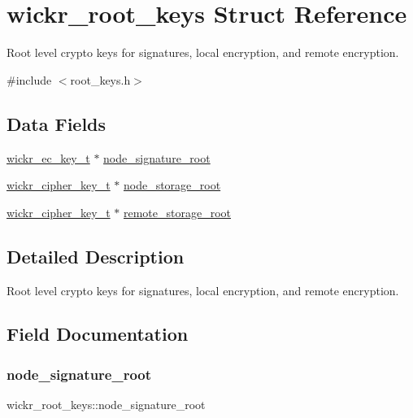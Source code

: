 \hypertarget{structwickr__root__keys}{}\section{wickr\+\_\+root\+\_\+keys Struct Reference}
\label{structwickr__root__keys}


Root level crypto keys for signatures, local encryption, and remote encryption.  




{\ttfamily \#include $<$root\+\_\+keys.\+h$>$}

\subsection*{Data Fields}
\begin{DoxyCompactItemize}
\item 
\mbox{\hyperlink{structwickr__ec__key}{wickr\+\_\+ec\+\_\+key\+\_\+t}} $\ast$ \mbox{\hyperlink{structwickr__root__keys_af3a0ca7b48b356e118dea24c26cdd9f5}{node\+\_\+signature\+\_\+root}}
\item 
\mbox{\hyperlink{structwickr__cipher__key}{wickr\+\_\+cipher\+\_\+key\+\_\+t}} $\ast$ \mbox{\hyperlink{structwickr__root__keys_ada908a5fa4aaf7c8b9a4b496c99e595a}{node\+\_\+storage\+\_\+root}}
\item 
\mbox{\hyperlink{structwickr__cipher__key}{wickr\+\_\+cipher\+\_\+key\+\_\+t}} $\ast$ \mbox{\hyperlink{structwickr__root__keys_a9bf1ff10b669493393e2bf918f5d4090}{remote\+\_\+storage\+\_\+root}}
\end{DoxyCompactItemize}


\subsection{Detailed Description}
Root level crypto keys for signatures, local encryption, and remote encryption. 

\subsection{Field Documentation}
\mbox{\label{structwickr__root__keys_af3a0ca7b48b356e118dea24c26cdd9f5}} 
\subsubsection{\texorpdfstring{node\_signature\_root}{node\_signature\_root}}
{\footnotesize\ttfamily wickr\+\_\+root\+\_\+keys\+::node\+\_\+signature\+\_\+root}

